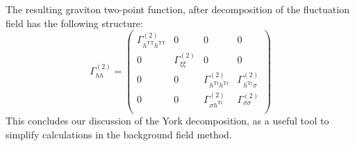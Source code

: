  The resulting graviton two-point function, after decomposition of the fluctuation field has the following structure:
\begin{equation} \Gamma^{(2)}_{hh} = 
\begin{pmatrix}
\Gamma^{(2)}_{h^{\mathrm{TT}}h^{\mathrm{TT}}} & 0 & 0 & 0 \\[10pt]
0 & \Gamma^{(2)}_{\xi\xi}  & 0 & 0 \\[10pt]
0 & 0 & \Gamma^{(2)}_{h^{\mathrm{Tr}}h^{\mathrm{Tr}}}  & \Gamma^{(2)}_{h^{\mathrm{Tr}}\sigma} \\[10pt]
0 & 0 & \Gamma^{(2)}_{\sigma h^{\mathrm{Tr}}} & \Gamma^{(2)}_{\sigma\sigma} \\

\end{pmatrix}
\end{equation}
 This concludes our discussion of the York decomposition, as a useful tool to simplify calculations in the background field method.
 \newpage
